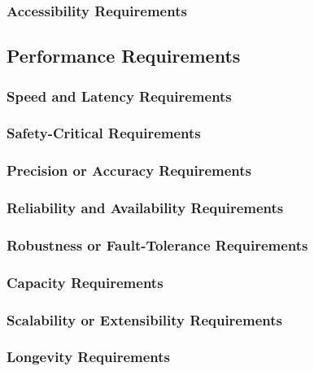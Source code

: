 \documentclass{article}
\begin{document}
\subsubsection{Accessibility Requirements}
\subsection{Performance Requirements}
\subsubsection{Speed and Latency Requirements}
\subsubsection{Safety-Critical Requirements}
\subsubsection{Precision or Accuracy Requirements}
\subsubsection{Reliability and Availability Requirements}
\subsubsection{Robustness or Fault-Tolerance Requirements}
\subsubsection{Capacity Requirements}
\subsubsection{Scalability or Extensibility Requirements}
\subsubsection{Longevity Requirements}




\end{document}
